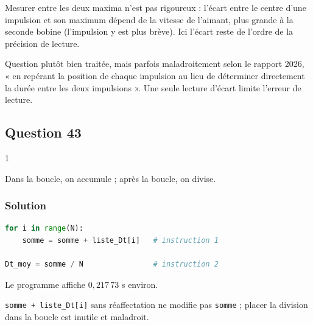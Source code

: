 \documentclass[11pt,a4paper]{article}
\newcommand{\equationajustee}[1]{%
  \sbox{\boiteequation}{$\displaystyle #1$}%
  \ifdim\wd\boiteequation>\linewidth
    \[\resizebox{\linewidth}{!}{\usebox{\boiteequation}}\]%
  \else
    \[#1\]%
  \fi}
\begin{document}
\equationajustee{\boxed{\Delta t\simeq216\ \mathrm{ms}\simeq0{,}22\ \mathrm{s}}}

\begin{piege}

Mesurer entre les deux maxima n'est pas rigoureux : l'écart entre le centre d'une impulsion et son maximum dépend de la vitesse de l'aimant, plus grande à la seconde bobine (l'impulsion y est plus brève). Ici l'écart reste de l'ordre de la précision de lecture.

\end{piege}

\begin{jury}

Question plutôt bien traitée, mais parfois maladroitement selon le rapport 2026, « en repérant la position de chaque impulsion au lieu de déterminer directement la durée entre les deux impulsions ». Une seule lecture d'écart limite l'erreur de lecture.

\end{jury}

\hypertarget{question-43}{%
\subsection{Question 43}\label{question-43}}

\begin{indication}{1}

Dans la boucle, on accumule ; après la boucle, on divise.

\end{indication}

\hypertarget{solution-42}{%
\subsubsection{Solution}\label{solution-42}}

\begin{lstlisting}[language=Python]
for i in range(N):
    somme = somme + liste_Dt[i]   # instruction 1

Dt_moy = somme / N                # instruction 2
\end{lstlisting}

Le programme affiche \(0{,}217\,73\) s environ.

\begin{piege}

\texttt{somme\ +\ liste\_Dt{[}i{]}\allowbreak{}} sans réaffectation ne modifie pas \texttt{somme} ; placer la division dans la boucle est inutile et maladroit.

\end{piege}
\end{document}
